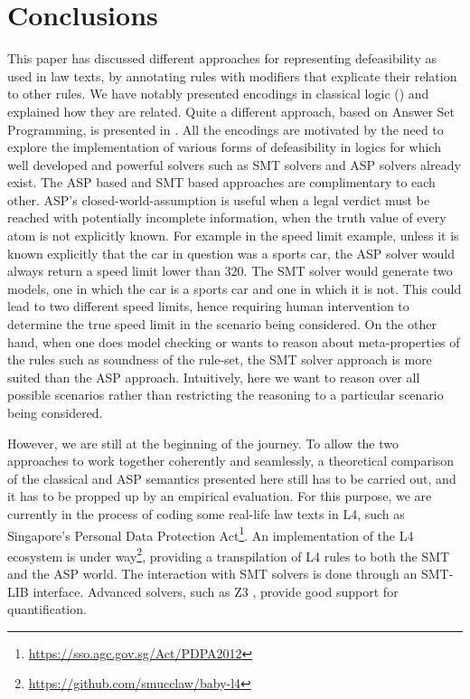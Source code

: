 \section{Conclusions}\label{sec:conclusions}

This paper has discussed different approaches for representing defeasibility
as used in law texts, by annotating rules with modifiers that explicate their
relation to other rules. We have notably presented encodings in classical
logic () and explained
how they are related. Quite a different approach,
based on Answer Set Programming, is presented in
. All the encodings are motivated by the need to
explore the implementation of various forms of defeasibility in logics for
which well developed and powerful solvers such as SMT solvers and ASP solvers
already exist. The ASP based and SMT based approaches are complimentary to
each other. ASP's closed-world-assumption is useful when a legal verdict must
be reached with potentially incomplete information, when the truth value of
every atom is not explicitly known. For example in the speed limit example,
unless it is known explicitly that the car in question was a sports car, the
ASP solver would always return a speed limit lower than $320$. The SMT solver
would generate two models, one in which the car is a sports car and one in
which it is not. This could lead to two different speed limits, hence
requiring human intervention to determine the true speed limit in the scenario
being considered. On the other hand, when one does model checking or wants to
reason about meta-properties of the rules such as soundness of the rule-set,
the SMT solver approach is more suited than the ASP approach. Intuitively,
here we want to reason over all possible scenarios rather than restricting the
reasoning to a particular scenario being considered.

However, we are still at the beginning of the journey. To allow the two
approaches to work together coherently and seamlessly, a theoretical
comparison of the classical and ASP semantics presented here still has to be
carried out, and it has to be propped up by an empirical evaluation. For this
purpose, we are currently in the process of coding some real-life law texts in
L4, such as Singapore's Personal Data Protection
Act\footnote{\url{https://sso.agc.gov.sg/Act/PDPA2012}}.  An implementation of
the L4 ecosystem is under
way\footnote{\url{https://github.com/smucclaw/baby-l4}}, providing a
transpilation of L4 rules to both the SMT and the ASP world. The interaction
with SMT solvers is done through an SMT-LIB \cite{BarFT_SMTLIB}
interface. Advanced solvers, such as Z3 \cite{demoura_bjorner_z3_2008},
provide good support for quantification.

